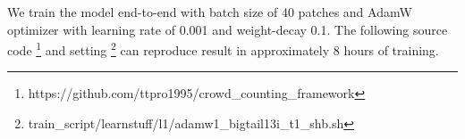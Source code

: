  
 We train the model end-to-end with batch size of 40 patches and AdamW optimizer \cite{loshchilov2017decoupled} with learning rate of 0.001 and weight-decay 0.1. The following source code \footnote{https://github.com/ttpro1995/crowd\_counting\_framework} and setting \footnote{train\_script/learnstuff/l1/adamw1\_bigtail13i\_t1\_shb.sh} can reproduce result in approximately 8 hours of training.








